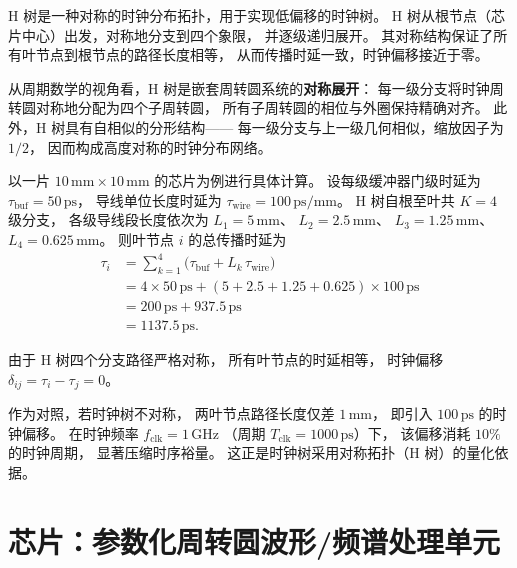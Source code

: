 \begin{example}[H 树时钟分布]
\label{ex:h_tree_clock}
H 树是一种对称的时钟分布拓扑，用于实现低偏移的时钟树。
H 树从根节点（芯片中心）出发，对称地分支到四个象限，
并逐级递归展开。
其对称结构保证了所有叶节点到根节点的路径长度相等，
从而传播时延一致，时钟偏移接近于零。

从周期数学的视角看，H 树是嵌套周转圆系统的\textbf{对称展开}：
每一级分支将时钟周转圆对称地分配为四个子周转圆，
所有子周转圆的相位与外圈保持精确对齐。
此外，H 树具有自相似的分形结构——
每一级分支与上一级几何相似，缩放因子为 $1/2$，
因而构成高度对称的时钟分布网络。

以一片 $10\,\text{mm} \times 10\,\text{mm}$ 的芯片为例进行具体计算。
设每级缓冲器门级时延为 $\tau_{\text{buf}} = 50\,\text{ps}$，
导线单位长度时延为 $\tau_{\text{wire}} = 100\,\text{ps/mm}$。
H 树自根至叶共 $K = 4$ 级分支，
各级导线段长度依次为
$L_1 = 5\,\text{mm}$、
$L_2 = 2.5\,\text{mm}$、
$L_3 = 1.25\,\text{mm}$、
$L_4 = 0.625\,\text{mm}$。
则叶节点 $i$ 的总传播时延为
\[
\begin{aligned}
\tau_i
&= \sum_{k=1}^{4}\bigl(\tau_{\text{buf}} + L_k\,\tau_{\text{wire}}\bigr) \\
&= 4 \times 50\,\text{ps}
   + (5 + 2.5 + 1.25 + 0.625)\times 100\,\text{ps} \\
&= 200\,\text{ps} + 937.5\,\text{ps} \\
&= 1137.5\,\text{ps}.
\end{aligned}
\]

由于 H 树四个分支路径严格对称，
所有叶节点的时延相等，
时钟偏移 $\delta_{ij} = \tau_i - \tau_j = 0$。

作为对照，若时钟树不对称，
两叶节点路径长度仅差 $1\,\text{mm}$，
即引入 $100\,\text{ps}$ 的时钟偏移。
在时钟频率 $f_{\text{clk}} = 1\,\text{GHz}$
（周期 $T_{\text{clk}} = 1000\,\text{ps}$）下，
该偏移消耗 $10\%$ 的时钟周期，
显著压缩时序裕量。
这正是时钟树采用对称拓扑（H 树）的量化依据。
\end{example}

\section{芯片：参数化周转圆波形/频谱处理单元}

